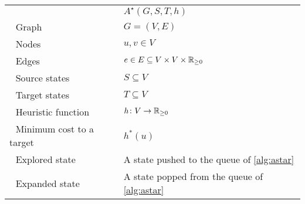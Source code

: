 \begin{table}[!h]
\begin{tabular}{ll}
	\hline
	\textbf{\A} & $A^\star(G,S,T,h)$\\
	\,\, Graph& $G=(V,E)$\\
	\,\, Nodes& $u,v \in V$\\
	\,\, Edges& $e \in E \subseteq V \times V \times \mathbb{R}_{\geq 0}$\\ 
	\,\, Source states& $S \subseteq V$\\
	\,\, Target states& $T \subseteq V$\\
	\,\, Heuristic function& $h \colon V \to \mathbb{R}_{\geq 0}$\\
	\,\, Minimum cost to a target& $h^*(u)$\\
	\,\, Explored state & A state pushed to the queue of \cref{alg:astar}\\
	\,\, Expanded state & A state popped from the queue of \cref{alg:astar}\\
	\hline
\end{tabular}
\end{table}